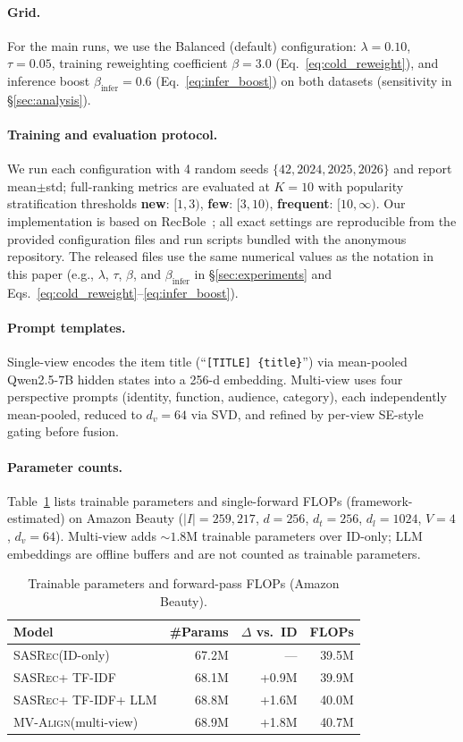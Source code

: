 \documentclass[sigconf,natbib=true,anonymous]{acmart}
\newcommand{\model}{\textsc{MV-Align}\xspace}
\newcommand{\base}{\textsc{SASRec}\xspace}
\newcommand{\tfidf}{\textsc{TF-IDF}\xspace}
\newcommand{\llm}{\textsc{LLM}\xspace}
\begin{document}
\paragraph{Grid.}
For the main runs, we use the Balanced (default) configuration:
$\lambda=0.10$, $\tau=0.05$, training reweighting coefficient
$\beta=3.0$ (Eq.~\eqref{eq:cold_reweight}), and inference boost
$\beta_{\text{infer}}=0.6$ (Eq.~\eqref{eq:infer_boost}) on both datasets
(sensitivity in \S\ref{sec:analysis}).
\paragraph{Training and evaluation protocol.}
We run each configuration with 4 random seeds
$\{42, 2024, 2025, 2026\}$ and report mean$\pm$std;
full-ranking metrics are evaluated at $K{=}10$
with popularity stratification thresholds
\textbf{new}: $[1,3)$, \textbf{few}: $[3,10)$,
\textbf{frequent}: $[10,\infty)$. Our implementation is based on
RecBole~\cite{zhao2021recbole}; all exact settings are
reproducible from the provided configuration files and run scripts
bundled with the anonymous repository.
The released files use the same numerical values as the notation in this paper
(e.g., $\lambda$, $\tau$, $\beta$, and $\beta_{\text{infer}}$ in
\S\ref{sec:experiments} and Eqs.~\eqref{eq:cold_reweight}--\eqref{eq:infer_boost}).
\paragraph{Prompt templates.}
Single-view encodes the item title (``\texttt{[TITLE] \{title\}}'') via
mean-pooled Qwen2.5-7B hidden states into a 256-d embedding.
Multi-view uses four perspective prompts (identity, function, audience, category),
each independently mean-pooled, reduced to $d_v{=}64$ via SVD, and refined by
per-view SE-style gating before fusion.

\paragraph{Parameter counts.}
Table~\ref{tab:params} lists trainable parameters and single-forward
FLOPs (framework-estimated) on Amazon Beauty ($|I|{=}259{,}217$,
$d{=}256$, $d_t{=}256$, $d_l{=}1024$, $V{=}4$, $d_v{=}64$).
Multi-view adds ${\sim}1.8$M trainable parameters over ID-only; \llm
embeddings are offline buffers and are not counted as trainable
parameters.

\begin{table}[h]
\caption{Trainable parameters and forward-pass FLOPs (Amazon Beauty).}
\label{tab:params}
\centering
\small
\begin{tabular}{lrrr}
\toprule
\textbf{Model} & \textbf{\#Params} & \textbf{$\Delta$ vs.\ ID} & \textbf{FLOPs} \\
\midrule
\base (ID-only) & 67.2M & --- & 39.5M \\
\base + \tfidf & 68.1M & +0.9M & 39.9M \\
\base + \tfidf + \llm & 68.8M & +1.6M & 40.0M \\
\model (multi-view) & 68.9M & +1.8M & 40.7M \\
\bottomrule
\end{tabular}
\end{table}
\end{document}
